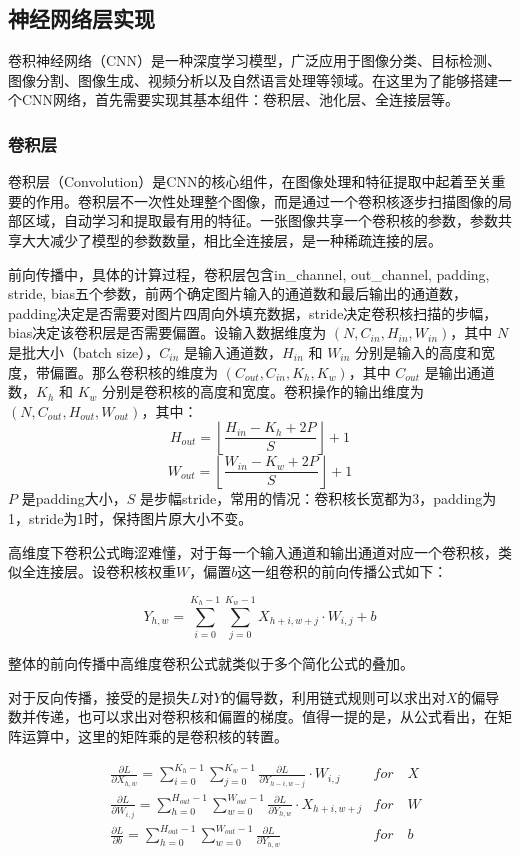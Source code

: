 \subsection{神经网络层实现}

卷积神经网络（CNN）是一种深度学习模型\cite{o2015introduction}，广泛应用于图像分类、目标检测、图像分割、图像生成、视频分析以及自然语言处理等领域。在这里为了能够搭建一个CNN网络，首先需要实现其基本组件：卷积层、池化层、全连接层等。

\subsubsection{卷积层}

卷积层（Convolution）是CNN的核心组件，在图像处理和特征提取中起着至关重要的作用。卷积层不一次性处理整个图像，而是通过一个卷积核逐步扫描图像的局部区域，自动学习和提取最有用的特征。一张图像共享一个卷积核的参数，参数共享大大减少了模型的参数数量，相比全连接层，是一种稀疏连接的层。

前向传播中，具体的计算过程，卷积层包含in\_channel, out\_channel, padding, stride, bias五个参数，前两个确定图片输入的通道数和最后输出的通道数，padding决定是否需要对图片四周向外填充数据，stride决定卷积核扫描的步幅，bias决定该卷积层是否需要偏置。设输入数据维度为 $(N, C_{in}, H_{in}, W_{in})$，其中 $N$ 是批大小（batch size），$C_{in}$ 是输入通道数，$H_{in}$ 和 $W_{in}$ 分别是输入的高度和宽度，带偏置。那么卷积核的维度为 $(C_{out}, C_{in}, K_h, K_w)$，其中 $C_{out}$ 是输出通道数，$K_h$ 和 $K_w$ 分别是卷积核的高度和宽度。卷积操作的输出维度为 $(N, C_{out}, H_{out}, W_{out})$，其中：
\[
H_{out} = \left\lfloor \frac{H_{in} - K_h + 2P}{S} \right\rfloor + 1
\]
\[
W_{out} = \left\lfloor \frac{W_{in} - K_w + 2P}{S} \right\rfloor + 1
\]
$P$ 是padding大小，$S$ 是步幅stride，常用的情况：卷积核长宽都为3，padding为1，stride为1时，保持图片原大小不变。

高维度下卷积公式晦涩难懂，对于每一个输入通道和输出通道对应一个卷积核，类似全连接层。设卷积核权重$W$，偏置$b$这一组卷积的前向传播公式如下：

\[
Y_{h,w} = \sum_{i=0}^{K_h-1} \sum_{j=0}^{K_w-1} X_{h+i, w+j} \cdot W_{i,j} + b
\]

整体的前向传播中高维度卷积公式就类似于多个简化公式的叠加。

对于反向传播，接受的是损失$L$对$Y$的偏导数，利用链式规则可以求出对$X$的偏导数并传递，也可以求出对卷积核和偏置的梯度。值得一提的是，从公式看出，在矩阵运算中，这里的矩阵乘的是卷积核的转置。

\begin{align*}
& \frac{\partial L}{\partial X_{h, w}} = \sum_{i=0}^{K_h-1} \sum_{j=0}^{K_w-1} \frac{\partial L}{\partial Y_{h-i, w-j}} \cdot W_{i,j} & for \quad X \\
& \frac{\partial L}{\partial W_{i, j}} = \sum_{h=0}^{H_{out}-1} \sum_{w=0}^{W_{out}-1} \frac{\partial L}{\partial Y_{h, w}} \cdot X_{h+i, w+j} & for \quad W \\
& \frac{\partial L}{\partial b} = \sum_{h=0}^{H_{out}-1} \sum_{w=0}^{W_{out}-1} \frac{\partial L}{\partial Y_{h, w}} & for \quad b \\
\end{align*}

